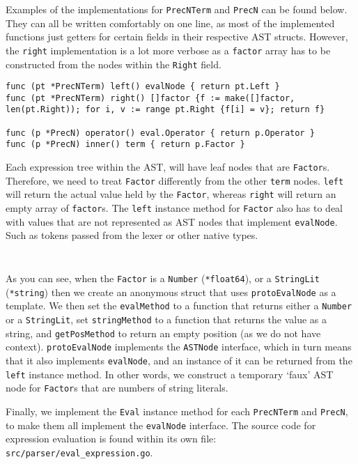 \inputminted[firstline=51, lastline=92, autogobble, breaklines, tabsize=4]{go}{../../src/parser/eval_expression.go}

Examples of the implementations for \verb|PrecNTerm| and \verb|PrecN| can be found below. They can all be written comfortably on one line, as most of the implemented functions just getters for certain fields in their respective AST structs. However, the \verb|right| implementation is a lot more verbose as a \verb|factor| array has to be constructed from the nodes within the \verb|Right| field.

\begin{verbatim}    
func (pt *PrecNTerm) left() evalNode { return pt.Left }
func (pt *PrecNTerm) right() []factor {f := make([]factor, len(pt.Right)); for i, v := range pt.Right {f[i] = v}; return f}

func (p *PrecN) operator() eval.Operator { return p.Operator }
func (p *PrecN) inner() term { return p.Factor }
\end{verbatim}

Each expression tree within the AST, will have leaf nodes that are \verb|Factor|s. Therefore, we need to treat \verb|Factor| differently from the other \verb|term| nodes. \verb|left| will return the actual value held by the \verb|Factor|, whereas \verb|right| will return an empty array of \verb|factor|s. The \verb|left| instance method for \verb|Factor| also has to deal with values that are not represented as AST nodes that implement \verb|evalNode|. Such as tokens passed from the lexer or other native types.

\inputminted[firstline=32, lastline=49, autogobble, breaklines, tabsize=4]{go}{../../src/parser/eval_expression.go}

\inputminted[firstline=130, lastline=179, autogobble, breaklines, tabsize=4]{go}{../../src/parser/eval_expression.go}

As you can see, when the \verb|Factor| is a \verb|Number| (\texttt{*float64}), or a \verb|StringLit| (\texttt{*string}) then we create an anonymous struct that uses \verb|protoEvalNode| as a template. We then set the \verb|evalMethod| to a function that returns either a \verb|Number| or a \verb|StringLit|, set \verb|stringMethod| to a function that returns the value as a string, and \verb|getPosMethod| to return an empty position (as we do not have context). \verb|protoEvalNode| implements the \verb|ASTNode| interface, which in turn means that it also implements \verb|evalNode|, and an instance of it can be returned from the \verb|left| instance method. In other words, we construct a temporary `faux' AST node for \verb|Factor|s that are numbers of string literals.

Finally, we implement the \verb|Eval| instance method for each \verb|PrecNTerm| and \verb|PrecN|, to make them all implement the \verb|evalNode| interface. The source code for expression evaluation is found within its own file: \verb|src/parser/eval_expression.go|.

\inputminted[firstline=182, lastline=194, fontsize=\footnotesize, autogobble, breaklines, tabsize=4]{go}{../../src/parser/eval_expression.go}
